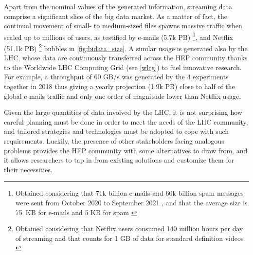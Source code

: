 Apart from the nominal values of the generated information, streaming data comprise a significant slice of the big data market.
As a matter of fact, the continual movement of small- to medium-sized files spawns massive traffic when scaled up to millions of users, as testified by e-mails (5.7k PB)%
\footnote{Obtained considering that 71k billion e-mails and 60k billion spam messages were sent from October 2020 to September 2021 \cite{statista2021mails}, and that the average size is \mbox{75 KB} for e-mails \cite{lifewire2021avg_mail} and \mbox{5} KB for spam \cite{medium2014avg_spam}
},
and Netflix (51.1k PB)%
\footnote{Obtained considering that Netflix users consumed 140 million hours per day of streaming \cite{domo2021infographic} and that counts for 1 GB of data for standard definition videos \cite{perry2021netflix}
} bubbles in \cref{fig:bidata_size}.
A similar usage is generated also by the LHC, whose data are continuously transferred across the HEP community thanks to the Worldwide LHC Computing Grid (see \cref{wlcg}) to fuel innovative research. For example, 
a throughput of 60 GB/s was generated by the 4 experiments together in 2018 \cite{wlcg2018throughput} thus giving a yearly projection (1.9k PB) close to half of the global e-mails traffic and only one order of magnitude lower than Netflix usage.

Given the large quantities of data involved by the LHC, it is not surprising how careful planning must be done in order to meet the needs of the LHC community, and tailored strategies and technologies must be adopted to cope with such requirements. 
Luckily, the presence of other stakeholders facing analogous problems provides the HEP community with some alternatives to draw from, and it allows researchers to tap in from existing solutions and customize them for their necessities.